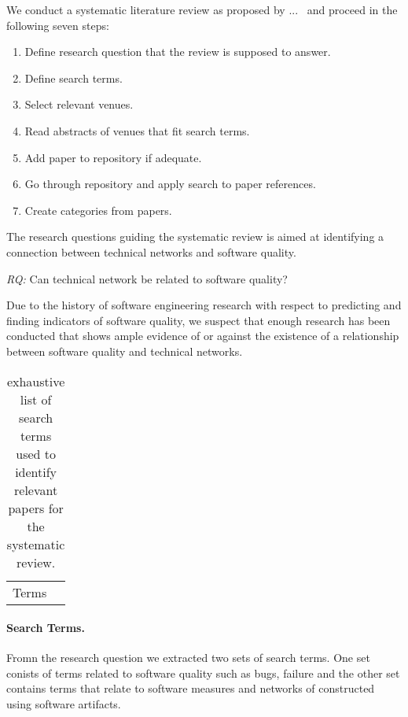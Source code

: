 We conduct a systematic literature review as proposed by ...~\cite{} and proceed in the following seven steps:

\begin{enumerate}
\item Define research question that the review is supposed to answer.
\item Define search terms.
\item Select relevant venues.
\item Read abstracts of venues that fit search terms.
\item Add paper to repository if adequate.
\item Go through repository and apply search to paper references.
\item Create categories from papers.
\end{enumerate}

The research questions guiding the systematic review is aimed at identifying a connection between technical networks and software quality.

\begin{note}
\emph{RQ:} Can technical network be related to software quality? 
\end{note}

Due to the history of software engineering research with respect to predicting and finding indicators of software quality, we suspect that enough research has been conducted that shows ample evidence of or against the existence of a relationship between software quality and technical networks.

\begin{table}
\centering
\begin{tabular}{ll}
Terms & \\
\end{tabular}
\label{chap:6:terms}
\caption{exhaustive list of search terms used to identify relevant papers for the systematic review.}
\end{table}

\paragraph{Search Terms.} Fromn the research question we extracted two sets of search terms.
One set conists of terms related to software quality such as bugs, failure and the other set contains terms that relate to software measures and networks of constructed using software artifacts.

